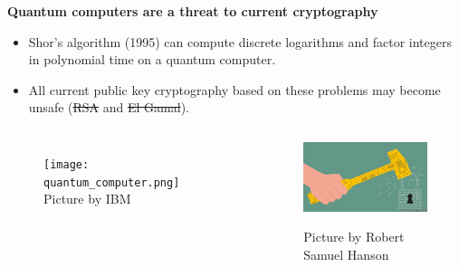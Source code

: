 \documentclass[10pt]{beamer}
\theoremstyle{plain}
\theoremstyle{definition}
\renewcommand{\(}{\left(}
\renewcommand{\)}{\right)}
\begin{document}
\begin{frame}
\textbf{Quantum computers are a threat to current cryptography}

\begin{itemize}
\item Shor's algorithm (1995) can compute discrete logarithms and factor integers in polynomial time on a quantum computer.

\item All current public key cryptography based on these problems may become unsafe (\sout{RSA} and \sout{El Gamal}).
\end{itemize}

\begin{columns}[t]

\begin{figure}
\texttt{[image: quantum\_computer.png]} 
{\tiny Picture by IBM}
\end{figure}



\begin{figure}
\includegraphics[width=6cm]{hammer.jpeg} 

{\tiny Picture by Robert Samuel Hanson}
\end{figure}


\end{columns}

\end{frame}
\end{document}
